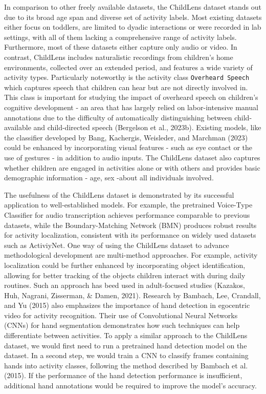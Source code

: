\documentclass[
  man,floatsintext]{apa6}
\begin{document}
In comparison to other freely available datasets, the ChildLens dataset stands out due to its broad age span and diverse set of activity labels. Most existing datasets either focus on toddlers, are limited to dyadic interactions or were recorded in lab settings, with all of them lacking a comprehensive range of activity labels. Furthermore, most of these datasets either capture only audio or video. In contrast, ChildLens includes naturalistic recordings from children's home environments, collected over an extended period, and features a wide variety of activity types. Particularly noteworthy is the activity class \texttt{Overheard\ Speech} which captures speech that children can hear but are not directly involved in. This class is important for studying the impact of overheard speech on children's cognitive development - an area that has largely relied on labor-intensive manual annotations due to the difficulty of automatically distinguishing between child-available and child-directed speech (Bergelson et al., 2023b). Existing models, like the classifier developed by Bang, Kachergis, Weisleder, and Marchman (2023) could be enhanced by incorporating visual features - such as eye contact or the use of gestures - in addition to audio inputs. The ChildLens dataset also captures whether children are engaged in activities alone or with others and provides basic demographic information - age, sex -about all individuals involved.

The usefulness of the ChildLens dataset is demonstrated by its successful application to well-established models. For example, the pretrained Voice-Type Classifier for audio transcription achieves performance comparable to previous datasets, while the Boundary-Matching Network (BMN) produces robust results for activity localization, consistent with its performance on widely used datasets such as ActiviyNet. One way of using the ChildLens dataset to advance methodological development are multi-method approaches. For example, activity localization could be further enhanced by incorporating object identification, allowing for better tracking of the objects children interact with during daily routines. Such an approach has beed used in adult-focused studies (Kazakos, Huh, Nagrani, Zisserman, \& Damen, 2021). Research by Bambach, Lee, Crandall, and Yu (2015) also emphasizes the importance of hand detection in egocentric video for activity recognition. Their use of Convolutional Neural Networks (CNNs) for hand segmentation demonstrates how such techniques can help differentiate between activities. To apply a similar approach to the ChildLens dataset, we would first need to run a pretrained hand detection model on the dataset. In a second step, we would train a CNN to classify frames containing hands into activity classes, following the method described by Bambach et al. (2015). If the performance of the hand detection performance is insufficient, additional hand annotations would be required to improve the model's accuracy.
\end{document}

